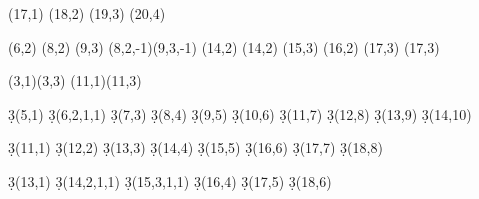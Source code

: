 \begin{sseqpage}
\class["\alpha_9" {below=0.2em}] (17,1)
\etaclass(18,2)
\etaclass(19,3)
\etaclass(20,4)





\class["{\beta_{2/2}}" {below=0.05em}, circlen=2](6,2)
\class["\beta_2" {below=0.2em}](8,2)
\class["\nu^3" {below=0.2em}](9,3) \structline(8,2,-1)(9,3,-1)
\class["{\beta_{4/4}}" {below=0.2em}, "4"](14,2)
\class["\beta_3" {below right=0.2em}](14,2) \etaclass(15,3)
\class["{\beta_{4/3}}" {below=0.2em}, circlen=3](16,2) \etaclass(17,3)
\class["{\nu \beta_3}" {below=0.2em}](17,3)


(3,1)(3,3)
(11,1)(11,3)

\d3(5,1)
\d3(6,2,1,1)
\d3(7,3)
\d3(8,4)
\d3(9,5)
\d3(10,6)
\d3(11,7)
\d3(12,8)
\d3(13,9)
\d3(14,10)

\d3(11,1)
\d3(12,2)
\d3(13,3)
\d3(14,4)
\d3(15,5)
\d3(16,6)
\d3(17,7)
\d3(18,8)

\d3(13,1)
\d3(14,2,1,1)
\d3(15,3,1,1)
\d3(16,4)
\d3(17,5)
\d3(18,6)

\end{sseqpage}
